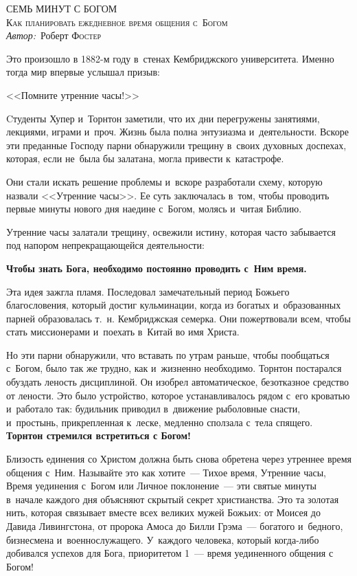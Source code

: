 \documentclass[12pt,article,a4paper,fittopage]{ncc}
\begin{document}
\begin{center}
\textsc{\LARGE СЕМЬ МИНУТ С БОГОМ}\\[0.5 cm]
\textsc{\Large Как планировать ежедневное время общения с~Богом}\\[0.5cm]
\emph{Автор:}\ Роберт \textsc{Фостер}
\end{center}

\setcounter{page}{1}
\thispagestyle{empty}

\begin{multicols}{2}

Это произошло в 1882-м году в~стенах Кембриджского университета. Именно тогда мир впервые услышал призыв:
\begin{center}
<<Помните утренние часы!>>
\end{center}
Cтуденты Хупер и~Торнтон заметили, что их дни перегружены занятиями, лекциями, играми и~проч. Жизнь была полна энтузиазма и~деятельности. Вскоре эти преданные Господу парни обнаружили трещину в~своих духовных доспехах, которая, если не~была бы залатана, могла привести к~катастрофе.

Они стали искать решение проблемы и~вскоре разработали схему, которую назвали <<Утренние часы>>. Ее суть заключалась в~том, чтобы проводить первые минуты нового дня наедине с~Богом, молясь и~читая Библию.

Утренние часы залатали трещину, освежили истину, которая часто забывается под напором непрекращающейся деятельности:

\begin{center}
\textbf{Чтобы знать Бога, необходимо постоянно проводить с~Ним время.}
\end{center}

Эта идея зажгла пламя. Последовал замечательный период Божьего благословения, который достиг кульминации, когда из богатых и~образованных парней образовалась т.~н. Кембриджская семерка. Они пожертвовали всем, чтобы стать миссионерами и~поехать в~Китай во имя Христа.

Но эти парни обнаружили, что вставать по утрам раньше, чтобы пообщаться с~Богом, было так же трудно, как и~жизненно необходимо. Торнтон постарался обуздать леность дисциплиной. Он изобрел автоматическое, безотказное средство от лености. Это было устройство, которое устанавливалось рядом с~его кроватью и~работало так: будильник приводил в~движение рыболовные снасти, и~простынь, прикрепленная к~леске, медленно сползала с~тела спящего. \textbf{Торнтон стремился встретиться с Богом!}

Близость единения со Христом должна быть снова обретена через утреннее время общения с~Ним. Называйте это как хотите~--- Тихое время, Утренние часы, Время уединения с~Богом или Личное поклонение~--- эти святые минуты в~начале каждого дня объясняют скрытый секрет христианства. Это та золотая нить, которая связывает вместе всех великих мужей Божьих: от Моисея до Давида Ливингстона, от пророка Амоса до Билли Грэма~--- богатого и~бедного, бизнесмена и~военнослужащего. У~каждого человека, который когда-либо добивался успехов для Бога, приоритетом \textnumero{}1~--- время уединенного общения с Богом!


\end{multicols}
\end{document}
